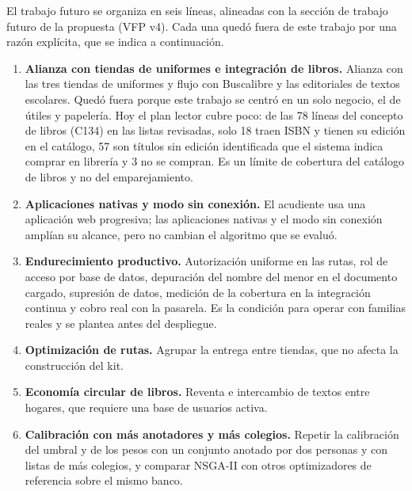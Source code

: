 El trabajo futuro se organiza en seis líneas, alineadas con la sección de trabajo futuro de la
propuesta (VFP v4). Cada una quedó fuera de este trabajo por una razón explícita, que se indica a
continuación.
\begin{enumerate}
\item \textbf{Alianza con tiendas de uniformes e integración de libros.} Alianza con las tres
tiendas de uniformes y flujo con Buscalibre y las editoriales de textos escolares. Quedó fuera
porque este trabajo se centró en un solo negocio, el de útiles y papelería. Hoy el plan lector cubre poco: de las 78 líneas del concepto de libros (C134)
en las listas revisadas, solo 18 traen ISBN y tienen su edición en el catálogo, 57 son títulos sin
edición identificada que el sistema indica comprar en librería y 3 no se compran. Es un límite de
cobertura del catálogo de libros y no del emparejamiento.
\item \textbf{Aplicaciones nativas y modo sin conexión.} El acudiente usa una aplicación web
progresiva; las aplicaciones nativas y el modo sin conexión amplían su alcance, pero no cambian el
algoritmo que se evaluó.
\item \textbf{Endurecimiento productivo.} Autorización uniforme en las rutas, rol de acceso por base
de datos, depuración del nombre del menor en el documento cargado, supresión de datos, medición de
la cobertura en la integración continua y cobro real con la pasarela. Es la condición para operar
con familias reales y se plantea antes del despliegue.
\item \textbf{Optimización de rutas.} Agrupar la entrega entre tiendas, que no afecta la
construcción del kit.
\item \textbf{Economía circular de libros.} Reventa e intercambio de textos entre hogares, que
requiere una base de usuarios activa.
\item \textbf{Calibración con más anotadores y más colegios.} Repetir la calibración del umbral y
de los pesos con un conjunto anotado por dos personas y con listas de más colegios, y comparar
NSGA-II con otros optimizadores de referencia sobre el mismo banco.
\end{enumerate}

